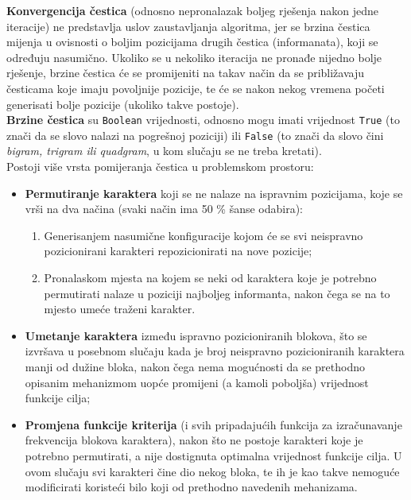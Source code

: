 \documentclass[12pt, a4paper]{article}
\begin{document}
\textbf{Konvergencija čestica} (odnosno nepronalazak boljeg rješenja nakon jedne iteracije) ne predstavlja uslov zaustavljanja algoritma, jer se brzina čestica mijenja u ovisnosti o boljim pozicijama drugih čestica (informanata), koji se određuju nasumično. Ukoliko se u nekoliko iteracija ne pronađe nijedno bolje rješenje, brzine čestica će se promijeniti na takav način da se približavaju česticama koje imaju povoljnije pozicije, te će se nakon nekog vremena početi generisati bolje pozicije (ukoliko takve postoje). \\

\textbf{Brzine čestica} su \texttt{Boolean} vrijednosti, odnosno mogu imati vrijednost \texttt{True} (to znači da se slovo nalazi na pogrešnoj poziciji) ili \texttt{False} (to znači da slovo čini \textit{bigram, trigram ili quadgram}, u kom slučaju se ne treba kretati). \\

Postoji više vrsta pomijeranja čestica u problemskom prostoru: \\

\begin{itemize}
\renewcommand\labelitemi{--}

\item \textbf{Permutiranje karaktera} koji se ne nalaze na ispravnim pozicijama, koje se vrši na dva načina (svaki način ima 50 \% šanse odabira):

\begin{enumerate}

\item Generisanjem nasumične konfiguracije kojom će se svi neispravno pozicionirani karakteri repozicionirati na nove pozicije;

\item Pronalaskom mjesta na kojem se neki od karaktera koje je potrebno permutirati nalaze u poziciji najboljeg informanta, nakon čega se na to mjesto umeće traženi karakter.

\end{enumerate}

\item \textbf{Umetanje karaktera} između ispravno pozicioniranih blokova, što se izvršava u posebnom slučaju kada je broj neispravno pozicioniranih karaktera manji od dužine bloka, nakon čega nema mogućnosti da se prethodno opisanim mehanizmom uopće promijeni (a kamoli poboljša) vrijednost funkcije cilja;

\item \textbf{Promjena funkcije kriterija} (i svih pripadajućih funkcija za izračunavanje frekvencija blokova karaktera), nakon što ne postoje karakteri koje je potrebno permutirati, a nije dostignuta optimalna vrijednost funkcije cilja. U ovom slučaju svi karakteri čine dio nekog bloka, te ih je kao takve nemoguće modificirati koristeći bilo koji od prethodno navedenih mehanizama.

\end{itemize}
\end{document}
